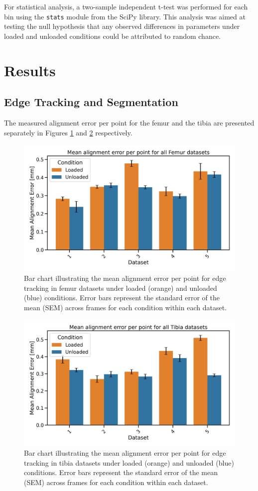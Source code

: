\documentclass{micro-econ-thesis}
\begin{document}
For statistical analysis, a two-sample independent t-test was performed for each bin using the \texttt{stats} module from the  SciPy library. This analysis was aimed at testing the null hypothesis that any observed differences in parameters under loaded and unloaded conditions could be attributed to random chance. 


\section{Results}
\label{sec:yetanother}

\subsection{Edge Tracking and Segmentation}

The measured alignment error per point for the femur and the tibia are presented separately in Figures \ref{fig:barfemur} and \ref{fig:bartibia} respectively. 
\begin{figure}[H]
	\centering
	\includegraphics[width=0.7\linewidth]{bar_no_1_3_Femur_both.png}
	\caption{Bar chart illustrating the mean alignment error per point for edge tracking in femur datasets under loaded (orange) and unloaded (blue) conditions. Error bars represent the standard error of the mean (SEM) across frames for each condition within each dataset.}
	\label{fig:barfemur}
\end{figure}

\begin{figure}[H]
	\centering
	\includegraphics[width=0.7\linewidth]{bar_no_1_3_Tibia_both.png}
	\caption{Bar chart illustrating the mean alignment error per point for edge tracking in tibia datasets under loaded (orange) and unloaded (blue) conditions. Error bars represent the standard error of the mean (SEM) across frames for each condition within each dataset.}
	\label{fig:bartibia}
\end{figure}
\end{document}
